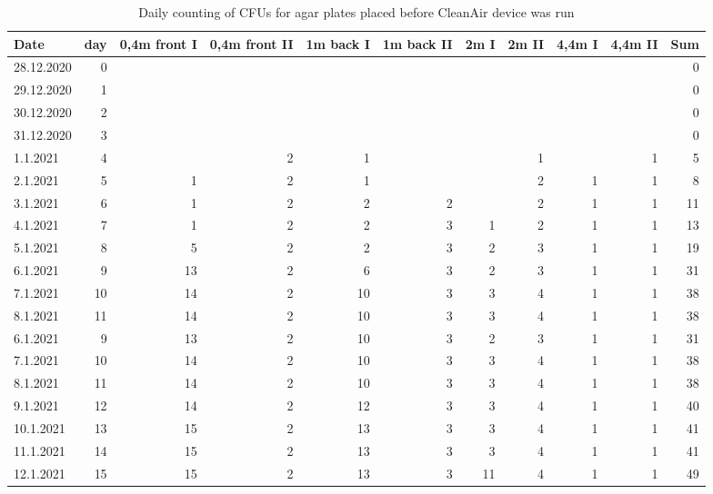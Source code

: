 \documentclass[hyperref]{labbook}
\begin{document}
\begin{table}[H]
\tiny
\begin{tabular}{|l r | rrrrrrrrr|}\hline
Date      &day&0,4m front I&0,4m front II&1m back I&1m back II&2m I&2m II&4,4m I&4,4m II&Sum\\\hline
28.12.2020&0  &            &             &           &            &    &     &      &       &0  \\
29.12.2020&1  &            &             &           &            &    &     &      &       &0  \\
30.12.2020&2  &            &             &           &            &    &     &      &       &0  \\
31.12.2020&3  &            &             &           &            &    &     &      &       &0  \\
1.1.2021  &4  &            &2            &1          &            &    &1    &      &1      &5  \\
2.1.2021  &5  &1           &2            &1          &            &    &2    &1     &1      &8  \\
3.1.2021  &6  &1           &2            &2          &2           &    &2    &1     &1      &11 \\
4.1.2021  &7  &1           &2            &2          &3           &1   &2    &1     &1      &13 \\
5.1.2021  &8  &5           &2            &2          &3           &2   &3    &1     &1      &19 \\
6.1.2021  &9  &13          &2            &6          &3           &2   &3    &1     &1      &31 \\
7.1.2021  &10 &14          &2            &10         &3           &3   &4    &1     &1      &38 \\
8.1.2021  &11 &14          &2            &10         &3           &3   &4    &1     &1      &38 \\
6.1.2021  &9  &13          &2            &10         &3           &2   &3    &1     &1      &31 \\
7.1.2021  &10 &14          &2            &10         &3           &3   &4    &1     &1      &38 \\
8.1.2021  &11 &14          &2            &10         &3           &3   &4    &1     &1      &38 \\
9.1.2021  &12 &14          &2            &12         &3           &3   &4    &1     &1      &40 \\
10.1.2021 &13 &15          &2            &13         &3           &3   &4    &1     &1      &41 \\
11.1.2021 &14 &15          &2            &13         &3           &3   &4    &1     &1      &41 \\
12.1.2021 &15 &15          &2            &13         &3           &11  &4    &1     &1      &49 \\\hline
\end{tabular}
\caption{Daily counting of CFUs for agar plates placed before CleanAir device was run}
\end{table}
\end{document}
